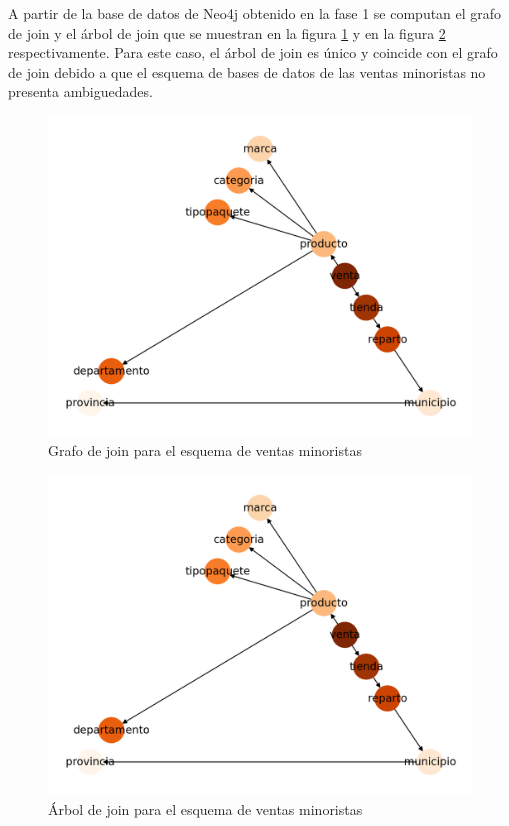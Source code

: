 A partir de la base de datos de Neo4j obtenido en la fase 1 se computan el grafo de join y el \'arbol de 
join que se muestran en la figura \ref{fig:graphjoin1} y en la figura \ref{fig:jointree1} respectivamente. Para este caso, 
el \'arbol de join es \'unico y coincide  con el grafo de join debido a que el esquema de bases de datos de 
las ventas minoristas no presenta ambiguedades.

\begin{figure}
  \centering
  \includegraphics[scale=0.6]{Graphics/joingraph1.png}
  \caption{Grafo de join para el esquema de ventas minoristas}
  \label{fig:graphjoin1}
\end{figure}

\begin{figure}
  \centering
  \includegraphics[scale=0.6]{Graphics/jointree1.png}
  \caption{\'Arbol de join para el esquema de ventas minoristas}
  \label{fig:jointree1}
\end{figure}

